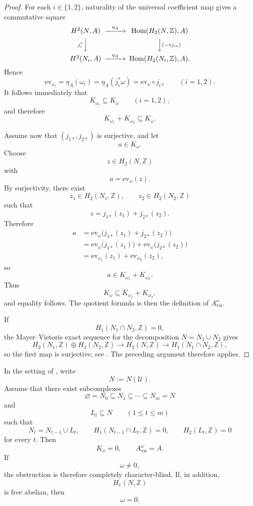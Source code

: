 \begin{proof}
For each $i\in\{1,2\}$, naturality of the universal coefficient map gives a commutative square
\[
\begin{CD}
H^2(N,A) @>\eta_A>> \mathrm{Hom}(H_2(N,\mathbb Z),A) \\
@Vj_i^*VV @VV(-\circ j_{i*})V \\
H^2(N_i,A) @>\eta_A>> \mathrm{Hom}(H_2(N_i,\mathbb Z),A).
\end{CD}
\]
Hence
\[
\mathrm{ev}_{\omega_i}=\eta_A(\omega_i)=\eta_A(j_i^*\omega)=\mathrm{ev}_{\omega}\circ j_{i*}
\qquad
(i=1,2).
\]
It follows immediately that
\[
K_{\omega_i}\subseteq K_{\omega}
\qquad
(i=1,2),
\]
and therefore
\[
K_{\omega_1}+K_{\omega_2}\subseteq K_{\omega}.
\]

Assume now that $(j_{1*},j_{2*})$ is surjective, and let
\[
a\in K_{\omega}.
\]
Choose
\[
z\in H_2(N,\mathbb Z)
\]
with
\[
a=\mathrm{ev}_{\omega}(z).
\]
By surjectivity, there exist
\[
z_1\in H_2(N_1,\mathbb Z),
\qquad
z_2\in H_2(N_2,\mathbb Z)
\]
such that
\[
z=j_{1*}(z_1)+j_{2*}(z_2).
\]
Therefore
\[
\begin{aligned}
a
&=\mathrm{ev}_{\omega}\bigl(j_{1*}(z_1)+j_{2*}(z_2)\bigr) \\
&=\mathrm{ev}_{\omega}\bigl(j_{1*}(z_1)\bigr)+\mathrm{ev}_{\omega}\bigl(j_{2*}(z_2)\bigr) \\
&=\mathrm{ev}_{\omega_1}(z_1)+\mathrm{ev}_{\omega_2}(z_2),
\end{aligned}
\]
so
\[
a\in K_{\omega_1}+K_{\omega_2}.
\]
Thus
\[
K_{\omega}\subseteq K_{\omega_1}+K_{\omega_2},
\]
and equality follows. The quotient formula is then the definition of $A_{\mathrm{vis}}^{\omega}$.

If
\[
H_1(N_1\cap N_2,\mathbb Z)=0,
\]
the Mayer--Vietoris exact sequence for the decomposition $N=N_1\cup N_2$ gives
\[
H_2(N_1,\mathbb Z)\oplus H_2(N_2,\mathbb Z)\longrightarrow H_2(N,\mathbb Z)\longrightarrow H_1(N_1\cap N_2,\mathbb Z),
\]
so the first map is surjective; see \cite[Sec.~2.2]{Hatcher2002}. The preceding argument therefore applies.
\end{proof}

\begin{corollary}\label{cor:piecewise-h2-trivial-residue}
In the setting of , write
\[
N:=N(\mathcal U).
\]
Assume that there exist subcomplexes
\[
\varnothing=N_0\subseteq N_1\subseteq \cdots \subseteq N_m=N
\]
and
\[
L_t\subseteq N
\qquad
(1\le t\le m)
\]
such that
\[
N_t=N_{t-1}\cup L_t,
\qquad
H_1(N_{t-1}\cap L_t,\mathbb Z)=0,
\qquad
H_2(L_t,\mathbb Z)=0
\]
for every $t$. Then
\[
K_{\omega}=0,
\qquad
A_{\mathrm{vis}}^{\omega}=A.
\]
If
\[
\omega\neq 0,
\]
the obstruction is therefore completely character-blind. If, in addition,
\[
H_1(N,\mathbb Z)
\]
is free abelian, then
\[
\omega=0.
\]
\end{corollary}

